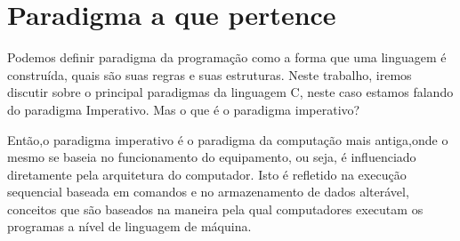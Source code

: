 \chapter{Paradigma a que pertence}

Podemos definir paradigma da programação como a forma que uma linguagem é construída, 
quais são suas regras e suas estruturas. Neste trabalho, iremos discutir sobre o principal 
paradigmas da linguagem C, neste caso estamos falando do paradigma Imperativo. Mas o que é o 
paradigma imperativo?

Então,o paradigma imperativo é o paradigma da computação mais antiga,onde o mesmo se baseia no
funcionamento do equipamento, ou seja, é influenciado diretamente pela arquitetura do computador.
Isto é refletido na execução sequencial baseada em comandos e no armazenamento de dados alterável,
conceitos que são baseados na maneira pela qual computadores executam os programas a nível de linguagem de máquina.


\newpage